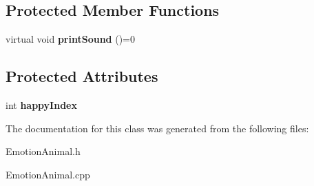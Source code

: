 \subsection*{Protected Member Functions}
\begin{DoxyCompactItemize}
\item 
\mbox{\label{class_emotion_animal_acfa023a678c278d8da78adac0bc3234f}} 
virtual void {\bfseries print\+Sound} ()=0
\end{DoxyCompactItemize}
\subsection*{Protected Attributes}
\begin{DoxyCompactItemize}
\item 
\mbox{\label{class_emotion_animal_a6619eb4ba696ac2892851cb3dacd863d}} 
int {\bfseries happy\+Index}
\end{DoxyCompactItemize}


The documentation for this class was generated from the following files\+:\begin{DoxyCompactItemize}
\item 
Emotion\+Animal.\+h\item 
Emotion\+Animal.\+cpp\end{DoxyCompactItemize}
